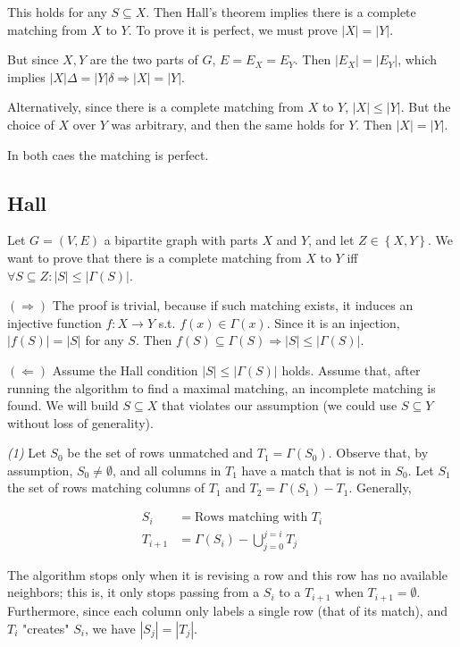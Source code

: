 \documentclass[a4paper, 12pt]{article}
\begin{document}
This holds for any $S \subseteq X$. Then Hall's theorem implies there is a
complete matching from $X$ to $Y$. To prove it is perfect, we must prove $|X| =
|Y|$.

But since $X, Y$ are the two parts of $G$, $E = E_X = E_Y$. Then $|E_X| =
|E_Y|$, which implies $|X| \Delta = |Y| \delta \Rightarrow |X| =
|Y|$.

Alternatively, since there is a complete matching from $X$ to $Y$, $|X| \leq
|Y|$. But the choice of $X$ over $Y$ was arbitrary, and then the same holds for
$Y$. Then $|X| = |Y|$.

In both caes the matching is perfect.



\pagebreak 

\subsection{Hall}

Let $G = (V, E)$ a bipartite graph with parts $X$ and $Y$, and let $Z \in
\left\{ X, Y \right\} $. We want to prove that there is a complete matching
from $X$ to $Y$ iff $\forall S \subseteq Z : |S| \leq |\Gamma(S)| $.

$(\Rightarrow)$ The proof is trivial, because if such matching exists, it
induces an injective function $f : X \to Y$ s.t. $f(x) \in \Gamma(x)$. Since it
is an injection, $|f(S)| = |S|$ for any $S$. Then $f(S) \subseteq \Gamma(S)
\Rightarrow |S| \leq |\Gamma(S)|$.

$(\Leftarrow)$ Assume the Hall condition $|S| \leq |\Gamma(S)|$ holds. Assume
that, after running the algorithm to find a maximal matching, an incomplete
matching is found. We will build $S \subseteq X$ that violates our assumption
(we could use $S \subseteq Y$ without loss of generality).

\textit{(1)} Let $S_0$ be the set of rows unmatched and $T_1 = \Gamma(S_0)$.
Observe that, by assumption, $S_0 \neq \emptyset$, and all columns in $T_1$
have a match that is not in $S_0$. Let $S_1$ the set of rows matching columns
of $T_1$ and $T_2 = \Gamma(S_1) - T_1$. Generally, 

\begin{align*}
    S_i &= \text{Rows matching with } T_i \\ 
    T_{i+1} &= \Gamma(S_i) - \bigcup^{j=i}_{j=0} T_j
\end{align*}

The algorithm stops only when it is revising a row and this row has no
available neighbors; this is, it only stops passing from a $S_i$ to a $T_{i+1}$
when $T_{i+1} = \emptyset$. Furthermore, since each column only labels a single
row (that of its match), and $T_i$ "creates" $S_i$, we have $|S_j| = |T_j|$. 
\end{document}
